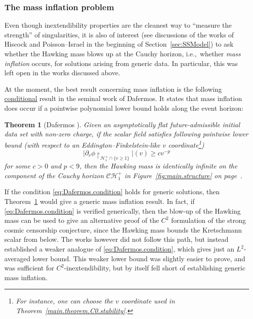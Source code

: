 \documentclass[10pt, reqno]{amsart}
\newtheorem{theorem}{Theorem}[section]
\theoremstyle{definition}
\theoremstyle{remark}
\numberwithin{equation}{section}
\newcommand{\rd}{\partial}
\newcommand{\0}{\emptyset}
\newcommand{\calC}{\mathcal C}
\newcommand{\calH}{\mathcal H}
\newcommand{\CH}{\calC \calH^{+}}		%
\newcommand{\EH}{\calH^{+}}
\begin{document}
\subsubsection{The mass inflation problem}\label{sec:mass.inflation} Even though inextendibility properties are the cleanest way to ``measure the strength'' of singularities, it is also of interest (see discussions of the works of Hiscock and Poisson--Israel in the beginning of Section~\ref{sec:SSModel}) to ask whether the Hawking mass blows up at the Cauchy horizon, i.e.,~whether \emph{mass inflation} occurs, for solutions arising from generic data. In particular, this was left open in the works \cite{LO.interior,LO.exterior,Sbierski.C1} discussed above.

At the moment, the best result concerning mass inflation is the following \underline{conditional} result in the seminal work \cite{D2} of Dafermos. It states that mass inflation does occur if a pointwise polynomial lower bound holds along the event horizon:
\begin{theorem}[Dafermos \cite{D2}]\label{thm:intro.dafermos}
Given an asymptotically flat future-admissible initial data set with non-zero charge, if the scalar field satisfies following pointwise lower bound (with respect to an Eddington--Finkelstein-like $v$ coordinate\footnote{For instance, one can choose the $v$ coordinate used in Theorem~\ref{main.theorem.C0.stability}.})
\begin{equation}\label{eq:Dafermos.condition}
|\rd_v\phi\restriction_{\EH_1\cap \{v\geq 1\}}|(v) \geq c v^{-p}
\end{equation}
for some $c>0$ and $p < 9$, then the Hawking mass is identically infinite on the component of the Cauchy horizon $\CH_1$ in Figure~\ref{fig:main.structure} on page~\pageref{fig:main.structure}.
\end{theorem}

If the condition \eqref{eq:Dafermos.condition} holds for generic solutions, then Theorem~\ref{thm:intro.dafermos} would give a generic mass inflation result. In fact, if \eqref{eq:Dafermos.condition} is verified generically, then the blow-up of the Hawking mass can be used to give an alternative proof of the $C^2$ formulation of the strong cosmic censorship conjecture, since the Hawking mass bounds the Kretschmann scalar from below. The works \cite{LO.interior, LO.exterior} however did not follow this path, but instead established a weaker analogue of \eqref{eq:Dafermos.condition}, which gives just an $L^2$-averaged lower bound. This weaker lower bound was slightly easier to prove, and was sufficient for $C^2$-inextendibility, but by itself fell short of establishing generic mass inflation.
\end{document}

